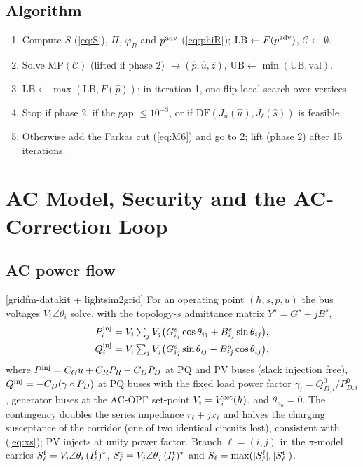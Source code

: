 \subsection{Algorithm}
\begin{enumerate}
\item Compute $S$ (\ref{eq:S}), $\Pi$, $\varphi_R$ and $p^{\rm adv}$ (\ref{eq:phiR}); $\mathrm{LB}\gets F(p^{\rm adv})$, $\mathcal C\gets\emptyset$.
\item Solve $\mathrm{MP}(\mathcal C)$ (lifted if phase 2) $\to(\hat p,\hat u,\hat z)$, $\mathrm{UB}\gets\min(\mathrm{UB},\mathrm{val})$.
\item $\mathrm{LB}\gets\max(\mathrm{LB},F(\hat p))$; in iteration 1, one-flip local search over vertices.
\item Stop if phase 2, if the gap $\le10^{-3}$, or if $\mathrm{DF}(J_u(\hat u),J_\ell(\hat s))$ is feasible.
\item Otherwise add the Farkas cut (\ref{eq:M6}) and go to 2; lift (phase 2) after 15 iterations.
\end{enumerate}

\section{AC Model, Security and the AC-Correction Loop}
\label{app:ac}

\subsection{AC power flow}
[gridfm-datakit + lightsim2grid] For an operating point $(h,s,p,u)$ the bus voltages
$V_i\angle\theta_i$ solve, with the topology-$s$ admittance matrix $Y^s=G^s+jB^s$,
\begin{align}
P^{\rm inj}_i&=V_i\textstyle\sum_{j}V_j\big(G^s_{ij}\cos\theta_{ij}+B^s_{ij}\sin\theta_{ij}\big),\label{eq:acp}\\
Q^{\rm inj}_i&=V_i\textstyle\sum_{j}V_j\big(G^s_{ij}\sin\theta_{ij}-B^s_{ij}\cos\theta_{ij}\big),\label{eq:acq}
\end{align}
where $P^{\rm inj}=C_Gu+C_RP_R-C_DP_D$ at PQ and PV buses (slack injection free),
$Q^{\rm inj}=-C_D(\gamma\circ P_D)$ at PQ buses with the fixed load power factor
$\gamma_i=Q^0_{D,i}/P^0_{D,i}$, generator buses at the AC-OPF set-point $V_i=V^{\rm set}_i(h)$, and
$\theta_{n_0}=0$. The contingency doubles the series impedance $r_\ell+jx_\ell$ and halves the
charging susceptance of the corridor (one of two identical circuits lost), consistent with
(\ref{eq:xs}); PV injects at unity power factor.
Branch $\ell=(i,j)$ in the $\pi$-model carries
$S^{\rm f}_\ell=V_i\angle\theta_i\,(I^{\rm f}_\ell)^\ast$, $S^{\rm t}_\ell=V_j\angle\theta_j\,(I^{\rm t}_\ell)^\ast$ and
$S_\ell=\max(|S^{\rm f}_\ell|,|S^{\rm t}_\ell|)$.

